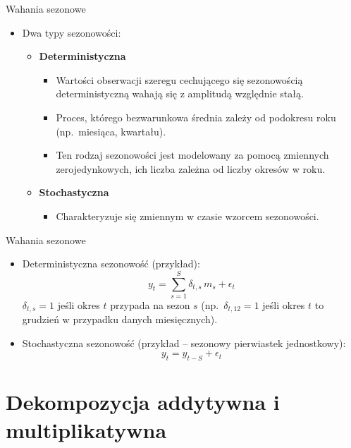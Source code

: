 \documentclass[11pt,usenames,dvipsnames,aspectratio=169]{beamer}
\begin{document}
\begin{frame}{Wahania sezonowe}
\begin{itemize}
    \item Dwa typy sezonowości:
    \begin{itemize}
        \item \textbf{Deterministyczna}
        \begin{itemize}
            \item Wartości obserwacji szeregu cechującego się sezonowością deterministyczną wahają się z amplitudą względnie stałą.
            \item Proces, którego bezwarunkowa średnia zależy od podokresu roku (np.\ miesiąca, kwartału).
            \item Ten rodzaj sezonowości jest modelowany za pomocą zmiennych zerojedynkowych, ich liczba zależna od liczby okresów w roku.
        \end{itemize}
        \item \textbf{Stochastyczna}
        \begin{itemize}
            \item Charakteryzuje się zmiennym w czasie wzorcem sezonowości.
        \end{itemize}
    \end{itemize}
\end{itemize}
\end{frame}

\begin{frame}{Wahania sezonowe}
\begin{itemize}
    \item Deterministyczna sezonowość (przykład):
    \[
    y_{t}=\sum_{s=1}^{S}\delta_{t,s}\,m_{s}+\epsilon_{t}
    \]
    $\delta_{t,s}=1$ jeśli okres $t$ przypada na sezon $s$ (np.\ $\delta_{t,12}=1$ jeśli okres $t$ to grudzień w przypadku danych miesięcznych).
    \item Stochastyczna sezonowość (przykład -- sezonowy pierwiastek jednostkowy):
    \[
    y_{t}=y_{t-S}+\epsilon_{t}
    \]
\end{itemize}
\end{frame}

\section{Dekompozycja addytywna i multiplikatywna}
\end{document}
